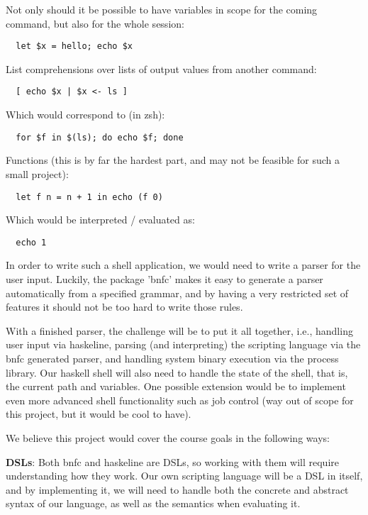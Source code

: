 \documentclass[11pt,a4paper]{article}
\begin{document}
Not only should it be possible to have variables in scope for the coming
command, but also for the whole session:

\begin{verbatim}
  let $x = hello; echo $x
\end{verbatim}

List comprehensions over lists of output values from another command:

\begin{verbatim}
  [ echo $x | $x <- ls ]
\end{verbatim}

Which would correspond to (in zsh):

\begin{verbatim}
  for $f in $(ls); do echo $f; done
\end{verbatim}

Functions (this is by far the hardest part, and may not be feasible for such a small project):

\begin{verbatim}
  let f n = n + 1 in echo (f 0)
\end{verbatim}

Which would be interpreted / evaluated as:

\begin{verbatim}
  echo 1
\end{verbatim}

In order to write such a shell application, we would need to write a parser for
the user input. Luckily, the package 'bnfc' makes it easy to generate a parser
automatically from a specified grammar, and by having a very restricted set of
features it should not be too hard to write those rules.

With a finished parser, the challenge will be to put it all together, i.e.,
handling user input via haskeline, parsing (and interpreting) the scripting
language via the bnfc generated parser, and handling system binary execution via
the process library. Our haskell shell will also need to handle the state of the
shell, that is, the current path and variables. One possible extension would be
to implement even more advanced shell functionality such as job control (way out
of scope for this project, but it would be cool to have).


We believe this project would cover the course goals in the following ways:

\textbf{DSLs}: Both bnfc and haskeline are DSLs, so working with them will require
understanding how they work. Our own scripting language will be a DSL in itself,
and by implementing it, we will need to handle both the concrete and abstract
syntax of our language, as well as the semantics when evaluating it.
\end{document}
